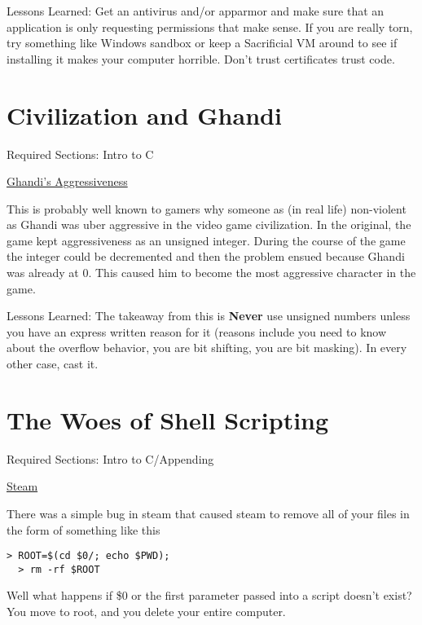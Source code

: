 Lessons Learned: Get an antivirus and/or apparmor and make sure that an application is only requesting permissions that make sense. If you are really torn, try something like Windows sandbox or keep a Sacrificial VM around to see if installing it makes your computer horrible. Don't trust certificates trust code.

\section{Civilization and Ghandi}

Required Sections: Intro to C

\href{https://www.geek.com/games/why-gandhi-is-always-a-warmongering-jerk-in-civilization-1608515/}{Ghandi's Aggressiveness}

This is probably well known to gamers why someone as (in real life) non-violent as Ghandi was uber aggressive in the video game civilization. In the original, the game kept aggressiveness as an unsigned integer. During the course of the game the integer could be decremented and then the problem ensued because Ghandi was already at 0. This caused him to become the most aggressive character in the game.

Lessons Learned: The takeaway from this is \textbf{Never} use unsigned numbers unless you have an express written reason for it (reasons include you need to know about the overflow behavior, you are bit shifting, you are bit masking). In every other case, cast it.


\section{The Woes of Shell Scripting}

Required Sections: Intro to C/Appending

\href{https://www.pcworld.com/article/2871653/scary-steam-for-linux-bug-erases-all-the-personal-files-on-your-pc.html}{Steam}

There was a simple bug in steam that caused steam to remove all of your files in the form of something like this

\begin{lstlisting}[language=console]
  > ROOT=$(cd $0/; echo $PWD);
  > rm -rf $ROOT
\end{lstlisting}

Well what happens if \$0 or the first parameter passed into a script doesn't exist? You move to root, and you delete your entire computer.


